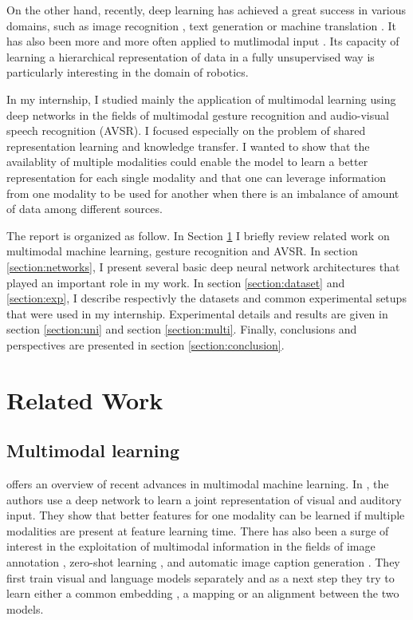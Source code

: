 On the other hand, recently, deep learning has achieved a great success in
various domains, such as image recognition \cite{A. Krizhevsky 2012},
text generation \cite{A. Graves 2013} or
machine translation \cite{I. Sutskever 2014}.
It has also been more and more often applied to mutlimodal input
\cite{J. Ngiam 2011, T. Baltrusaitis 2017}.
Its capacity of learning a hierarchical representation of data in a
fully unsupervised way \cite{P. Vincent 2010, A. Radford 2015}
is particularly interesting in the domain of robotics.

In my internship, I studied mainly the application of multimodal learning
using deep networks in the fields of multimodal gesture recognition
and audio-visual speech recognition (AVSR).
I focused especially on the problem
of shared representation learning and knowledge transfer. I wanted to show
that the availablity of multiple modalities could enable the model
to learn a better representation for each single modality and that one can
leverage information from one modality to be used for another when there
is an imbalance of amount of data among different sources.

The report is organized as follow. In Section \ref{section:related} I
briefly review related work on multimodal machine learning, gesture
recognition and AVSR. In section \ref{section:networks}, I present
several basic deep neural network architectures that played an important
role in my work. In section \ref{section:dataset} and
\ref{section:exp}, I describe respectivly the datasets and common
experimental setups that were used in my internship. Experimental
details and results are given in section \ref{section:uni} and
section \ref{section:multi}. Finally, conclusions and perspectives are
presented in section \ref{section:conclusion}.

\section{Related Work} \label{section:related}

\subsection{Multimodal learning}

\cite{T. Baltrusaitis 2017} offers an overview of recent advances in
multimodal machine learning. In \cite{J. Ngiam 2011}, the authors
use a deep network to learn a joint representation of visual and auditory
input. They show that better features for one modality can be learned if
multiple modalities are present at feature learning time. 
There has also been a surge of interest in the exploitation of multimodal
information in the fields of image annotation \cite{J. Weston 2010},
zero-shot learning \cite{A. Frome 2013, R. Socher 2013}, and automatic
image caption generation \cite{A. Karpathy 2015}. They first train
visual and language models separately and as a next step they try
to learn either a common embedding \cite{J. Weston 2010}, a mapping
\cite{A. Frome 2013, R. Socher 2013} or an alignment \cite{A. Karpathy 2015}
between the two models.

